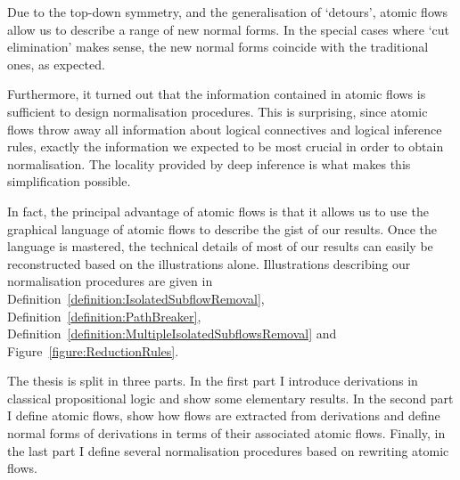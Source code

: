 Due to the top-down symmetry, and the generalisation of `detours', atomic flows allow us to describe a range of new normal forms. In the special cases where `cut elimination' makes sense, the new normal forms coincide with the traditional ones, as expected.

Furthermore, it turned out that the information contained in atomic flows is sufficient to design normalisation procedures. This is surprising, since atomic flows throw away all information about logical connectives and logical inference rules, exactly the information we expected to be most crucial in order to obtain normalisation. The locality provided by deep inference is what makes this simplification possible.

In fact, the principal advantage of atomic flows is that it allows us to use the graphical language of atomic flows to describe the gist of our results. Once the language is mastered, the technical details of most of our results can easily be reconstructed based on the illustrations alone. Illustrations describing our normalisation procedures are given in Definition~\vref{definition:IsolatedSubflowRemoval}, Definition~\vref{definition:PathBreaker}, Definition~\vref{definition:MultipleIsolatedSubflowsRemoval} and Figure~\vref{figure:ReductionRules}.

The thesis is split in three parts. In the first part I introduce derivations in classical propositional logic and show some elementary results. In the second part I define atomic flows, show how flows are extracted from derivations and define normal forms of derivations in terms of their associated atomic flows. Finally, in the last part I define several normalisation procedures based on rewriting atomic flows.
